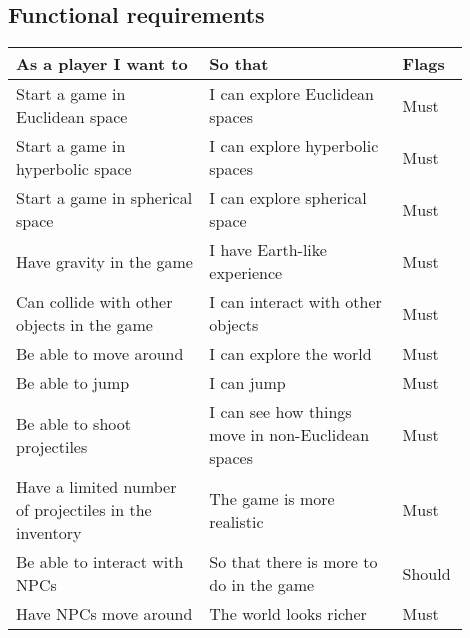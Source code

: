 \documentclass[12pt]{article}
\begin{document}
\subsection{Functional requirements}

\begin{table}[H]
    \begin{tabular}{p{0.4\linewidth}|p{0.4\linewidth}|p{0.1\linewidth}}
        \hline
        \textbf{As a player I want to}                             & \textbf{So that}                                                   & \textbf{Flags} \\ \hline
        Start a game in Euclidean space                            & I can explore Euclidean spaces                                     & Must           \\
        Start a game in hyperbolic space                           & I can explore hyperbolic spaces                                    & Must           \\
        Start a game in spherical space                            & I can explore spherical space                                      & Must           \\
        Have gravity in the game                                   & I have Earth-like experience                                       & Must           \\
        Can collide with other objects in the game                 & I can interact with other objects                                  & Must           \\
        Be able to move around                                     & I can explore the world                                            & Must           \\
        Be able to jump                                            & I can jump                                                         & Must           \\
        Be able to shoot projectiles                               & I can see how things move in non-Euclidean spaces                  & Must           \\
        Have a limited number of projectiles in the inventory      & The game is more realistic                                         & Must           \\
        Be able to interact with NPCs                              & So that there is more to do in the game                            & Should         \\
        Have NPCs move around                                      & The world looks richer                                             & Must           \\

\end{tabular}
\end{table}
\end{document}
